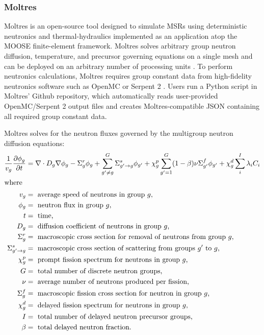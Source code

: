 \subsubsection{Moltres}
Moltres is an open-source tool designed to simulate \glspl{MSR} using 
deterministic neutronics and thermal-hydraulics implemented as an application 
atop the \gls{MOOSE} finite-element framework.  
Moltres solves arbitrary group neutron diffusion, temperature, and precursor 
governing equations on a single mesh and can be deployed on an arbitrary number 
of processing units \cite{lindsay_introduction_2018}.
To perform neutronics calculations, Moltres requires group constant data from 
high-fidelity neutronics software such as OpenMC \cite{romano_openmc:_2015} or 
Serpent 2 \cite{leppanen_serpent_2014}. 
Users run a Python script in Moltres' Github repository, which automatically reads
user-provided OpenMC/Serpent 2 output files and creates Moltres-compatible JSON 
containing all required group constant data.

Moltres solves for the neutron fluxes governed by the multigroup neutron diffusion 
equations:
\begin{align}
    \label{eq:moltres-diffusion-equation}
    \frac{1}{v_g} \frac{\partial \phi_g}{\partial t} &= \nabla \cdot D_g
    \nabla \phi_g - \Sigma^r_g \phi_g +
    \sum^G_{g' \neq g} \Sigma^s_{g' \rightarrow g} \phi_{g'} + \chi^p_g
    \sum^G_{g'=1} (1-\beta) \nu \Sigma^f_{g'} \phi_{g'} + \chi^d_g \sum^I_i
    \lambda_i C_i \\
    \intertext{where}
    v_g &= \text{ average speed of neutrons in group $g$,} \nonumber \\
    \phi_g &= \text{ neutron flux in group $g$,}\nonumber \\
    t &= \text{ time,} \nonumber \\
    D_g &= \text{ diffusion coefficient of neutrons in group $g$,} \nonumber \\
    \Sigma^r_g &= \text{ macroscopic cross section for removal of neutrons from group $g$,} \nonumber \\
    \Sigma^s_{g' \rightarrow g} &= \text{ macroscopic cross section of scattering from groups $g'$ to $g$,} \nonumber \\
    \chi^p_g &= \text{ prompt fission spectrum for neutrons in group $g$,} \nonumber \\
    G &= \text{ total number of discrete neutron groups,} \nonumber \\
    \nu &= \text{ average number of neutrons produced per fission,} \nonumber \\
    \Sigma^f_{g} &= \text{ macroscopic fission cross section for neutron in group $g$,} \nonumber \\
    \chi^d_g &= \text{ delayed fission spectrum for neutrons in group $g$,} \nonumber \\
    I &= \text{ total number of delayed neutron precursor groups,} \nonumber \\
    \beta &= \text{ total delayed neutron fraction.} \nonumber
\end{align}

